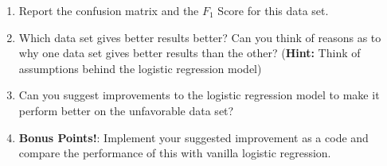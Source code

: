 \documentclass[11pt,a4paper]{article}
\begin{document}
	\begin{enumerate}
		\item Report the confusion matrix and the $ F_1 $ Score for this data set.
		\item Which data set gives better results better? Can you think of reasons as to why one data set gives better results than the other? (\textbf{Hint:} Think of assumptions behind the logistic regression model)
		\item Can you suggest improvements to the logistic regression model to make it perform better on the unfavorable data set? 
		\item \textbf{Bonus Points!}: Implement your suggested improvement as a code and compare the performance of this with vanilla logistic regression. 
	\end{enumerate}
	
 
	
	 
	
\end{document}
